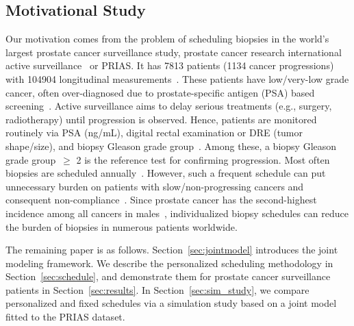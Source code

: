 \subsection{Motivational Study}
\label{subsec:motivational_study}
Our motivation comes from the problem of scheduling biopsies in the world's largest prostate cancer surveillance study, prostate cancer research international active surveillance~\citep{bokhorst2015compliance} or PRIAS. It has 7813 patients (1134 cancer progressions) with 104904 longitudinal measurements~\citep{tomer2020webapp}. These patients have low/very-low grade cancer, often over-diagnosed due to prostate-specific antigen (PSA) based screening~\citep{loeb2014overdiagnosis}. Active surveillance aims to delay serious treatments (e.g., surgery, radiotherapy) until progression is observed. Hence, patients are monitored routinely via PSA (ng/mL), digital rectal examination or DRE (tumor shape/size), and biopsy Gleason grade group~\citep{epsteinGG2014}. Among these, a biopsy Gleason grade group~$\geq$ 2 is the reference test for confirming progression. Most often biopsies are scheduled annually~\citep{loeb2014heterogeneity}. However, such a frequent schedule can put unnecessary burden on patients with slow/non-progressing cancers and consequent non-compliance~\citep{bokhorst2015compliance}. Since prostate cancer has the second-highest incidence among all cancers in males~\citep{GlobalCancerStats2012}, individualized biopsy schedules can reduce the burden of biopsies in numerous patients worldwide.

The remaining paper is as follows. Section~\ref{sec:jointmodel} introduces the joint modeling framework. We describe the personalized scheduling methodology in Section~\ref{sec:schedule}, and demonstrate them for prostate cancer surveillance patients in Section~\ref{sec:results}. In Section~\ref{sec:sim_study}, we compare personalized and fixed schedules via a simulation study based on a joint model fitted to the PRIAS dataset. 
